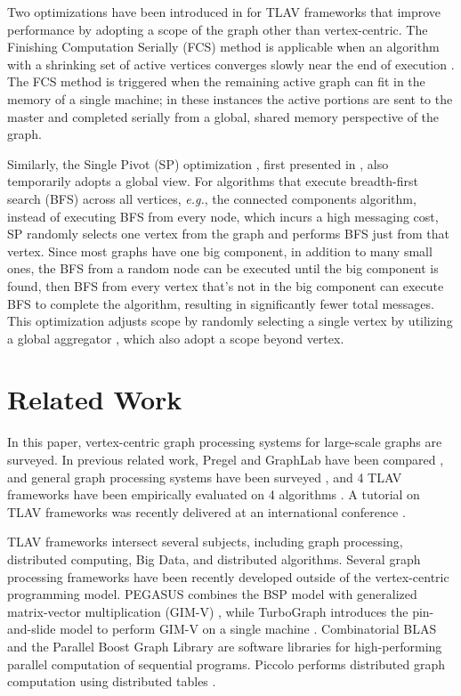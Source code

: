 \documentclass[reprint,twocolumn,showpacs,preprintnumbers,amsmath, aps,pre,amssymb]{revtex4-1}
\begin{document}
Two optimizations have been introduced in \cite{Salihoglu2014} for TLAV frameworks that improve performance by adopting a scope of the graph other than vertex-centric.  The Finishing Computation Serially (FCS) method is applicable when an algorithm with a shrinking set of active vertices converges slowly near the end of execution \cite{Salihoglu2014}.  The FCS method is triggered when the remaining active graph can fit in the memory of a single machine; in these instances the active portions are sent to the master and completed serially from a global, shared memory perspective of the graph. 

Similarly, the Single Pivot (SP) optimization \cite{Salihoglu2014}, first presented in \cite{Quick2012}, also temporarily adopts a global view.  For algorithms that execute breadth-first search (BFS) across all vertices, {\em e.g.}, the connected components algorithm, instead of executing BFS from every node, which incurs a high messaging cost, SP randomly selects one vertex from the graph and performs BFS just from that vertex.  Since most graphs have one big component, in addition to many small ones, the BFS from a random node can be executed until the big component is found, then BFS from every vertex that's not in the big component can execute BFS to complete the algorithm, resulting in significantly fewer total messages.  This optimization adjusts scope by randomly selecting a single vertex by utilizing a global aggregator \cite{Malewicz2010}, which also adopt a scope beyond vertex.

\section{Related Work}
\label{sec:related}

In this paper, vertex-centric graph processing systems for large-scale graphs are surveyed.  In previous related work, Pregel and GraphLab have been compared \cite{Sakr2013}, and general graph processing systems have been surveyed \cite{Khan2014,Nisar2013}, and 4 TLAV frameworks have been empirically evaluated on 4 algorithms \cite{Han2014}.  A tutorial on TLAV frameworks was recently delivered at an international conference \cite{Ajwani2015}.

TLAV frameworks intersect several subjects, including graph processing, distributed computing, Big Data, and distributed algorithms.  Several graph processing frameworks have been recently developed outside of the vertex-centric programming model.  PEGASUS combines the BSP model with generalized matrix-vector multiplication (GIM-V) \cite{Kang2011}, while TurboGraph introduces the pin-and-slide model to perform GIM-V on a single machine \cite{Han2013}. Combinatorial BLAS \cite{Bulucc2011} and the Parallel Boost Graph Library \cite{Gregor2005} are software libraries for high-performing parallel computation of sequential programs.  Piccolo performs distributed graph computation using distributed tables \cite{power2010}.  
\end{document}
